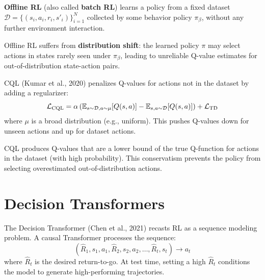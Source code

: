 \begin{definition}[Offline RL]
\textbf{Offline RL} (also called \textbf{batch RL}) learns a policy
from a fixed dataset $\mathcal{D} = \{(s_i, a_i, r_i, s'_i)\}_{i=1}^N$
collected by some behavior policy $\pi_\beta$, without any further
environment interaction.
\end{definition}

\begin{attention}[title=\textbf{Distribution Shift}]
Offline RL suffers from \textbf{distribution shift}: the learned policy
$\pi$ may select actions in states rarely seen under $\pi_\beta$,
leading to unreliable Q-value estimates for out-of-distribution
state-action pairs.
\end{attention}

\begin{definition}
CQL (Kumar et al., 2020) penalizes Q-values for actions not in the
dataset by adding a regularizer:
\[
    \mathcal{L}_{\text{CQL}} = \alpha \left(
    \mathbb{E}_{s \sim \mathcal{D}, a \sim \mu}[Q(s,a)]
    - \mathbb{E}_{s,a \sim \mathcal{D}}[Q(s,a)] \right)
    + \mathcal{L}_{\text{TD}}
\]
where $\mu$ is a broad distribution (e.g., uniform). This pushes
Q-values down for unseen actions and up for dataset actions.
\end{definition}

\begin{proposition}
CQL produces Q-values that are a lower bound of the true Q-function
for actions in the dataset (with high probability). This conservatism
prevents the policy from selecting overestimated out-of-distribution
actions.
\end{proposition}

\section{Decision Transformers}
\label{sec:dt}

\begin{definition}
The Decision Transformer (Chen et al., 2021) recasts RL as a
sequence modeling problem. A causal Transformer processes the sequence:
\[
    (\hat{R}_1, s_1, a_1, \hat{R}_2, s_2, a_2, \ldots, \hat{R}_t, s_t)
    \to a_t
\]
where $\hat{R}_t$ is the desired return-to-go. At test time, setting a
high $\hat{R}_t$ conditions the model to generate high-performing
trajectories.
\end{definition}


